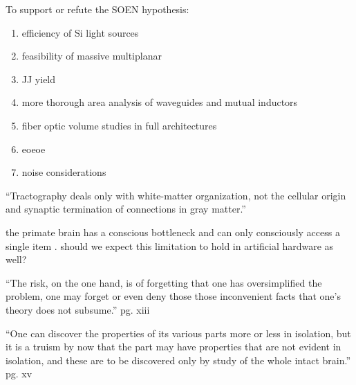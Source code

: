 \vspace{3em}
To support or refute the SOEN hypothesis:
\begin{enumerate}
\item efficiency of Si light sources
\item feasibility of massive multiplanar
\item JJ yield
\item more thorough area analysis of waveguides and mutual inductors
\item fiber optic volume studies in full architectures
\item eoeoe
\item noise considerations
\end{enumerate}

\vspace{3em}
 \cite{bosp2015} ``Tractography deals only with white-matter organization, not the cellular origin and synaptic termination of connections in gray matter.''

\vspace{3em}
the primate brain has a conscious bottleneck and can only consciously access a single item \cite{dela2017}. should we expect this limitation to hold in artificial hardware as well?

\vspace{3em}
``The risk, on the one hand, is of forgetting that one has oversimplified the problem, one may forget or even deny those those inconvenient facts that one's theory does not subsume.'' \cite{he1949} pg. xiii

\vspace{3em}
``One can discover the properties of its various parts more or less in isolation, but it is a truism by now that the part may have properties that are not evident in isolation, and these are to be discovered only by study of the whole intact brain.'' \cite{he1949} pg. xv